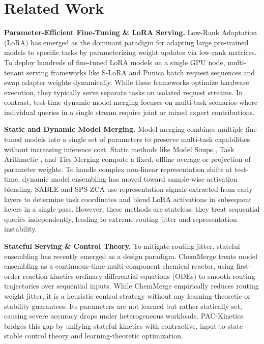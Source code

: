 \section{Related Work}
\label{sec:related_work}

\textbf{Parameter-Efficient Fine-Tuning \& LoRA Serving.} Low-Rank Adaptation (LoRA) \cite{hu2021lora} has emerged as the dominant paradigm for adapting large pre-trained models to specific tasks by parameterizing weight updates via low-rank matrices. To deploy hundreds of fine-tuned LoRA models on a single GPU node, multi-tenant serving frameworks like S-LoRA \cite{sheng2023slora} and Punica \cite{chen2023punica} batch request sequences and swap adapter weights dynamically. While these frameworks optimize hardware execution, they typically serve separate tasks on isolated request streams. In contrast, test-time dynamic model merging focuses on multi-task scenarios where individual queries in a single stream require joint or mixed expert contributions.

\textbf{Static and Dynamic Model Merging.} Model merging combines multiple fine-tuned models into a single set of parameters to preserve multi-task capabilities without increasing inference cost. Static methods like Model Soups \cite{wortsman2022model}, Task Arithmetic \cite{ilharco2022editing}, and Ties-Merging \cite{yadav2023ties} compute a fixed, offline average or projection of parameter weights. To handle complex non-linear representation shifts at test-time, dynamic model ensembling has moved toward sample-wise activation blending. SABLE \cite{sable_2024} and SPS-ZCA \cite{zhang24spszca} use representation signals extracted from early layers to determine task coordinates and blend LoRA activations in subsequent layers in a single pass. However, these methods are stateless: they treat sequential queries independently, leading to extreme routing jitter and representation instability.

\textbf{Stateful Serving \& Control Theory.} To mitigate routing jitter, stateful ensembling has recently emerged as a design paradigm. ChemMerge \cite{chemmerge_2026} treats model ensembling as a continuous-time multi-component chemical reactor, using first-order reaction kinetics ordinary differential equations (ODEs) to smooth routing trajectories over sequential inputs. While ChemMerge empirically reduces routing weight jitter, it is a heuristic control strategy without any learning-theoretic or stability guarantees. Its parameters are not learned but rather statically set, causing severe accuracy drops under heterogeneous workloads. PAC-Kinetics bridges this gap by unifying stateful kinetics with contractive, input-to-state stable control theory and learning-theoretic optimization.

